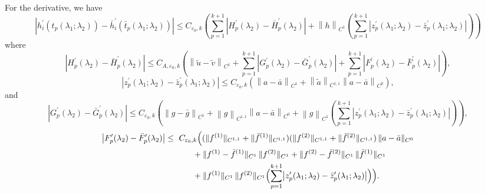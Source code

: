 \documentclass[a4paper,reqno,11pt]{amsart}
\numberwithin{equation}{section} %
\begin{document}
For the derivative, we have
$$
\left| h_{i}^{\prime}\left( t_p\left( \lambda _1;\lambda _2 \right) \right) -\bar{h}_{i}^{\prime}\left( \bar{t}_p\left( \lambda _1;\lambda _2 \right) \right) \right|\leq C_{\varepsilon _0,k}\left( \sum_{p=1}^{k+1}{\left| H_{p}^{\prime}\left( \lambda _2 \right) -\bar{H}_{p}^{\prime}\left( \lambda _2 \right) \right|}+\left\| h \right\| _{C^1}\left( \sum_{p=1}^{k+1}{\left| z_{p}^{\prime}\left( \lambda _1;\lambda _2 \right) -\bar{z}_{p}^{\prime}\left( \lambda _1;\lambda _2 \right) \right|} \right) \right) 
$$
where
$$
\left| H_{p}^{\prime}\left( \lambda _2 \right) -\bar{H}_{p}^{\prime}\left( \lambda _2 \right) \right|\le C_{A,\varepsilon _0,k}\left( \left\| \tilde{u}-\tilde{v} \right\| _{C^1}+\sum_{p=1}^{k+1}{\left| G_{p}^{\prime}\left( \lambda _2 \right) -\bar{G}_{p}^{\prime}\left( \lambda _2 \right) \right|}+\sum_{p=1}^{k+1}{\left| F_{p}^{\prime}\left( \lambda _2 \right) -\bar{F}_{p}^{\prime}\left( \lambda _2 \right) \right|} \right) ,
$$
$$
\left| z_{p}^{\prime}\left( \lambda _1;\lambda _2 \right) -\bar{z}_{p}^{\prime}\left( \lambda _1;\lambda _2 \right) \right|\le C_{\varepsilon _0,k}\left( \left\lVert  a-\bar{a}\right\rVert  _{C^1}+ \left\lVert \tilde{a}\right\rVert  _{C^{1,1}}\left\lVert  a-\bar{a}\right\rVert  _{C^0} \right) ,
$$
and
$$
\left| G_{p}^{\prime}\left( \lambda _2 \right) -\bar{G}_{p}^{\prime}\left( \lambda _2 \right) \right|\le C_{\varepsilon _0,k}\left( \left\| g-\bar{g} \right\| _{C^1}+\left\| g \right\| _{C^{1,1}}\left\| a-\bar{a} \right\| _{C^0}+\left\| g \right\| _{C^1}\left( \sum_{p=1}^{k+1}{\left| z_{p}^{\prime}\left( \lambda _1;\lambda _2 \right) -\bar{z}_{p}^{\prime}\left( \lambda _1;\lambda _2 \right) \right|} \right) \right) ,
$$
\[
\begin{aligned}
\bigl|F'_p(\lambda_2)-\bar F'_p(\lambda_2)\bigr|
\le{}&\ C_{\varepsilon_0,k}\Bigl(
  (\|f^{(1)}\|_{C^{1,1}}+\|\bar f^{(1)}\|_{C^{1,1}})
  (\|f^{(2)}\|_{C^{1,1}}+\|\bar f^{(2)}\|_{C^{1,1}})\,\|a-\bar a\|_{C^{0}} \\
&\qquad + \|f^{(1)}-\bar f^{(1)}\|_{C^{1}}\,\|f^{(2)}\|_{C^{1}}
  + \|f^{(2)}-\bar f^{(2)}\|_{C^{1}}\,\|\bar f^{(1)}\|_{C^{1}} \\
&\qquad + \|f^{(1)}\|_{C^{1}}\,\|f^{(2)}\|_{C^{1}}
   \Bigl(\sum_{p=1}^{k+1}\bigl|z'_p(\lambda_1;\lambda_2)-\bar z'_p(\lambda_1;\lambda_2)\bigr|\Bigr)
\Bigr).
\end{aligned}
\]
\end{document}
